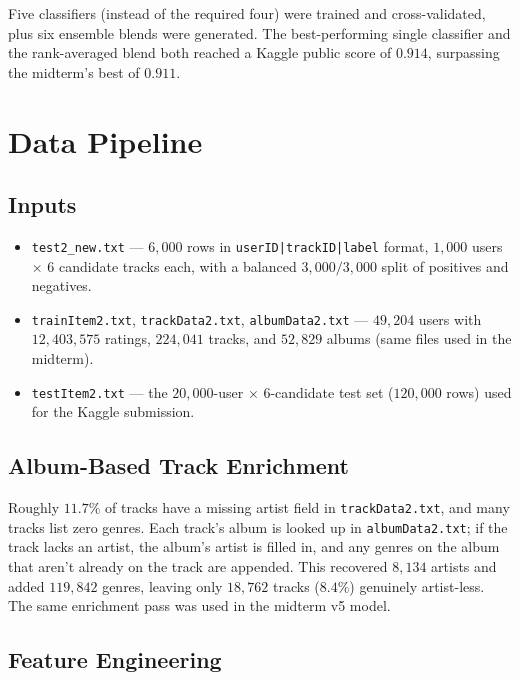 \documentclass[12pt]{article}
\begin{document}
	Five classifiers (instead of the required four) were trained and cross-validated, plus six ensemble blends were generated. The best-performing single classifier and the rank-averaged blend both reached a Kaggle public score of $0.914$, surpassing the midterm's best of $0.911$.

	\newpage
	\section{Data Pipeline}\label{sec:data}

	\subsection{Inputs}

	\begin{itemize}
		\item \texttt{test2\_new.txt} --- $6{,}000$ rows in \texttt{userID|trackID|label} format, $1{,}000$ users $\times$ 6 candidate tracks each, with a balanced $3{,}000/3{,}000$ split of positives and negatives.
		\item \texttt{trainItem2.txt}, \texttt{trackData2.txt}, \texttt{albumData2.txt} --- $49{,}204$ users with $12{,}403{,}575$ ratings, $224{,}041$ tracks, and $52{,}829$ albums (same files used in the midterm).
		\item \texttt{testItem2.txt} --- the $20{,}000$-user $\times$ 6-candidate test set ($120{,}000$ rows) used for the Kaggle submission.
	\end{itemize}

	\subsection{Album-Based Track Enrichment}

	Roughly $11.7\%$ of tracks have a missing artist field in \texttt{trackData2.txt}, and many tracks list zero genres. Each track's album is looked up in \texttt{albumData2.txt}; if the track lacks an artist, the album's artist is filled in, and any genres on the album that aren't already on the track are appended. This recovered $8{,}134$ artists and added $119{,}842$ genres, leaving only $18{,}762$ tracks ($8.4\%$) genuinely artist-less. The same enrichment pass was used in the midterm v5 model.

	\subsection{Feature Engineering}\label{sec:features}
\end{document}
